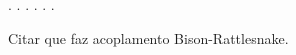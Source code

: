 \cite{Larsson2012}.
\cite{Janosy2011}.
\cite{Leppanen2012}.
\cite{Faghihi2011}.
\cite{Jasak2007}. 
\cite{Baglietto2011}.

Citar \cite{Gleicher2014} que faz acoplamento Bison-Rattlesnake.

